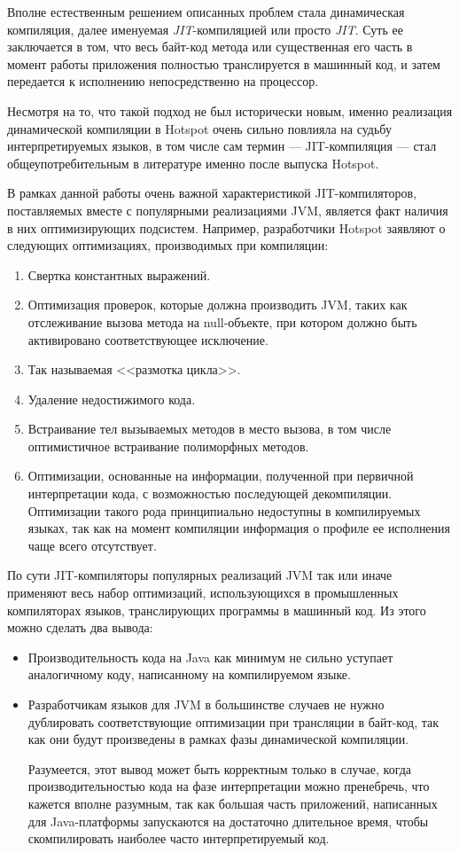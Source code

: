 Вполне естественным решением описанных проблем стала динамическая компиляция, далее именуемая
\textit{JIT}-компиляцией или просто \textit{JIT}. Суть ее заключается в том, что весь байт-код
метода или существенная его часть в момент работы приложения полностью транслируется в машинный код,
и затем передается к исполнению непосредственно на процессор.

Несмотря на то, что такой подход не был исторически новым, именно реализация динамической
компиляции в Hotspot очень сильно повлияла на судьбу интерпретируемых языков, в том числе
сам термин --- JIT-компиляция --- стал общеупотребительным в литературе именно после выпуска
Hotspot\cite{JITHistory}.

В рамках данной работы очень важной характеристикой JIT-компиляторов, поставляемых вместе
с популярными реализациями JVM, является факт наличия в них оптимизирующих подсистем. Например,
разработчики Hotspot заявляют о следующих оптимизациях, производимых при
компиляции\cite{HotSpotOT}:

\begin{enumerate}
    \item Свертка константных выражений.
    \item Оптимизация проверок, которые должна производить JVM, таких как отслеживание вызова
    метода на null-объекте, при котором должно быть активировано соответствующее исключение.
    \item Так называемая <<размотка цикла>>.
    \item Удаление недостижимого кода.
    \item Встраивание тел вызываемых методов в место вызова, в том числе оптимистичное встраивание
    полиморфных методов.
    \item Оптимизации, основанные на информации, полученной при первичной интерпретации кода,
    с возможностью последующей декомпиляции. Оптимизации такого рода принципиально недоступны
    в компилируемых языках, так как на момент компиляции информация о профиле ее исполнения чаще
    всего отсутствует.
\end{enumerate}

По сути JIT-компиляторы популярных реализаций JVM так или иначе применяют весь набор оптимизаций,
использующихся в промышленных компиляторах языков, транслирующих программы в машинный код.
Из этого можно сделать два вывода:
\begin{itemize}
    \item Производительность кода на Java как минимум не сильно уступает аналогичному коду,
    написанному на компилируемом языке.
    \item Разработчикам языков для JVM в большинстве случаев не нужно дублировать соответствующие
    оптимизации при трансляции в байт-код, так как они будут произведены в рамках фазы
    динамической компиляции.

    Разумеется, этот вывод может быть корректным только в случае, когда производительностью кода
    на фазе интерпретации можно пренебречь, что кажется вполне разумным, так как большая часть
    приложений, написанных для Java-платформы запускаются на достаточно длительное время,
    чтобы скомпилировать наиболее часто интерпретируемый код.
\end{itemize}

